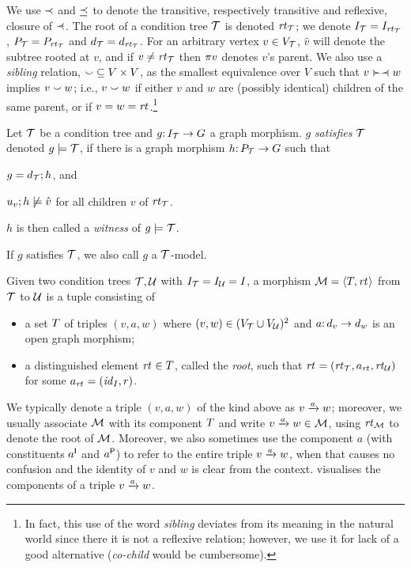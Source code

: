 We use $\ancestof$ and $\ancesteq$ to denote the transitive, respectively transitive and reflexive, closure of $\parentof$. The root of a condition tree $\cT$ is denoted $\rt\cT$; we denote $I_\cT=I_{\rt\cT}$, $P_\cT=P_{\rt\cT}$ and $d_\cT=d_{\rt\cT}$. For an arbitrary vertex $v\in V_\cT$, $\hat v$ will denote the subtree rooted at $v$, and if $v\neq\rt\cT$ then $\parent v$ denotes $v$'s parent. We also use a \emph{sibling} relation, ${\sibling}\subseteq V\times V$, as the smallest equivalence over $V$ such that $v\childof\parentof w$ implies $v\sibling w$; i.e., $v\sibling w$ if either $v$ and $w$ are (possibly identical) children of the same parent, or if $v=w=\rt{}$.\footnote{In fact, this use of the word \emph{sibling} deviates from its meaning in the natural world since there it is not a reflexive relation; however, we use it for lack of a good alternative (\emph{co-child} would be cumbersome).}

\begin{definition}[satisfaction]\label{def:satisfaction}
Let $\cT$ be a condition tree and $g\of I_\cT\to G$ a graph morphism. $g$ \emph{satisfies $\cT$} denoted $g\sat \cT$, if there is a graph morphism $h\of P_\cT\to G$ such that
\begin{inumerate}
\item $g=d_\cT;h$, and 
\item $u_v;h\nsat \hat v$ for all children $v$ of $\rt\cT$.
\end{inumerate}
$h$ is then called a \emph{witness} of $g\sat \cT$.
\end{definition}
%
If $g$ satisfies $\cT$, we also call $g$ a $\cT$-model.


\begin{definition}[morphism]\label{def:morphism}
Given two condition trees $\cT,\cU$ with $I_\cT=I_\cU=I$, a morphism $\cM=\tupof{\tp,\rt{}}$ from $\cT$ to $\cU$ is a tuple consisting of
\begin{itemize}
\item a set $\tp$ of triples $(v,a,w)$ where $(v,w)\in (V_\cT\cup V_\cU)^2$ and $a\of d_v\to d_w$ is an open graph morphism;
\item a distinguished element $\rt{}\in\tp$, called the \emph{root}, such that $\rt{}=(\rt\cT,a_{\rt{}},\rt\cU)$ for some $a_{\rt{}}=(\id_I,r)$.
\end{itemize}
\end{definition}
%
We typically denote a triple $(v,a,w)$ of the kind above as $\trip vaw$; moreover, we usually associate $\cM$ with its component $\tp$ and write $\trip vaw\in\cM$, using $\rt\cM$ to denote the root of $\cM$. Moreover, we also sometimes use the component $a$ (with constituents $a\I$ and $a\P$) to refer to the entire triple $\trip vaw$, when that causes no confusion and the identity of $v$ and $w$ is clear from the context.  visualises the components of a triple $\trip vaw$.

